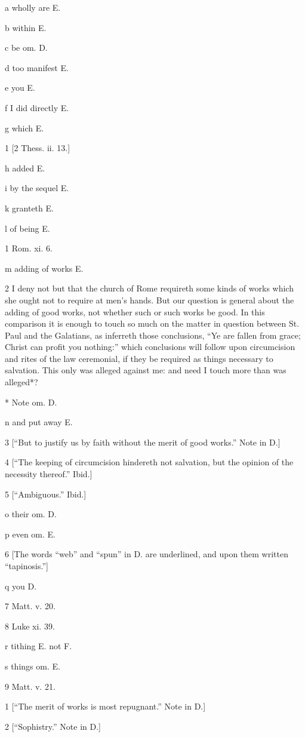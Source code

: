 a
wholly are E.

b
within E.

c
be om. D.

d
too manifest E.

e
you E.

f
I did directly E.

g
which E.

1
[2 Thess. ii. 13.]

h
added E.

i
by the sequel E.

k
granteth E.

l
of being E.

1
Rom. xi. 6.

m
adding of works E.

2
I deny not but that the church of Rome requireth some kinds of works which she ought not to require at men’s hands. But our question is general about the adding of good works, not whether such or such works be good. In this comparison it is enough to touch so much on the matter in question between St. Paul and the Galatians, as inferreth those conclusions, “Ye are fallen from grace; Christ can profit you nothing:” which conclusions will follow upon circumcision and rites of the law ceremonial, if they be required as things necessary to salvation. This only was alleged against me: and need I touch more than was alleged*?

*
Note om. D.

n
and put away E.

3
[“But to justify us by faith without the merit of good works.” Note in D.]

4
[“The keeping of circumcision hindereth not salvation, but the opinion of the necessity thereof.” Ibid.]

5
[“Ambiguous.” Ibid.]

o
their om. D.

p
even om. E.

6
[The words “web” and “spun” in D. are underlined, and upon them written “tapinosis.”]

q
you D.

7
Matt. v. 20.

8
Luke xi. 39.

r
tithing E. not F.

s
things om. E.

9
Matt. v. 21.

1
[“The merit of works is most repugnant.” Note in D.]

2
[“Sophistry.” Note in D.]

